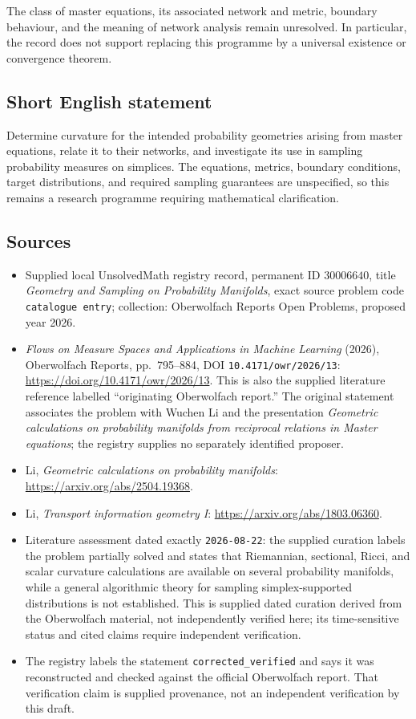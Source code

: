 \documentclass[11pt]{article}
\begin{document}
The class of master equations, its associated network and metric, boundary behaviour, and the meaning of network analysis remain unresolved. In particular, the record does not support replacing this programme by a universal existence or convergence theorem.
\subsection{Short English statement}
Determine curvature for the intended probability geometries arising from master equations, relate it to their networks, and investigate its use in sampling probability measures on simplices. The equations, metrics, boundary conditions, target distributions, and required sampling guarantees are unspecified, so this remains a research programme requiring mathematical clarification.
\subsection{Sources}
\begin{itemize}
\item Supplied local UnsolvedMath registry record, permanent ID \(30006640\), title \emph{Geometry and Sampling on Probability Manifolds}, exact source problem code \texttt{catalogue entry}; collection: Oberwolfach Reports Open Problems, proposed year 2026.
\item \emph{Flows on Measure Spaces and Applications in Machine Learning} (2026), Oberwolfach Reports, pp.\ 795--884, DOI \texttt{10.4171/owr/2026/13}: \url{https://doi.org/10.4171/owr/2026/13}. This is also the supplied literature reference labelled ``originating Oberwolfach report.'' The original statement associates the problem with Wuchen Li and the presentation \emph{Geometric calculations on probability manifolds from reciprocal relations in Master equations}; the registry supplies no separately identified proposer.
\item Li, \emph{Geometric calculations on probability manifolds}: \url{https://arxiv.org/abs/2504.19368}.
\item Li, \emph{Transport information geometry I}: \url{https://arxiv.org/abs/1803.06360}.
\item Literature assessment dated exactly \texttt{2026-08-22}: the supplied curation labels the problem partially solved and states that Riemannian, sectional, Ricci, and scalar curvature calculations are available on several probability manifolds, while a general algorithmic theory for sampling simplex-supported distributions is not established. This is supplied dated curation derived from the Oberwolfach material, not independently verified here; its time-sensitive status and cited claims require independent verification.
\item The registry labels the statement \texttt{corrected\_verified} and says it was reconstructed and checked against the official Oberwolfach report. That verification claim is supplied provenance, not an independent verification by this draft.
\end{itemize}
\end{document}
